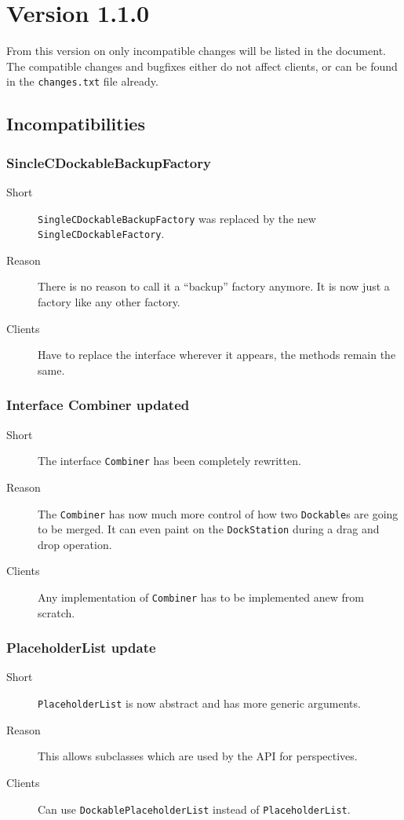 \documentclass[a4paper,10pt]{article}
\newcommand{\src}[1]{\lstinline[basicstyle=\normalsize\ttfamily,keywordstyle=\normalsize\ttfamily,identifierstyle=\normalsize\ttfamily]|#1|}
\newcommand{\short}{\item[Short]}
\newcommand{\why}{\item[Reason]}
\newcommand{\clients}{\item[Clients]}
\begin{document}
\section{Version 1.1.0}
From this version on only incompatible changes will be listed in the document. The compatible changes and bugfixes either do not affect clients, or can be found in the \src{changes.txt} file already.
\subsection{Incompatibilities}

\subsubsection{SincleCDockableBackupFactory}
\begin{description}
 \short \src{SingleCDockableBackupFactory} was replaced by the new \linebreak \src{SingleCDockableFactory}.
 \why There is no reason to call it a ``backup'' factory anymore. It is now just a factory like any other factory.
 \clients Have to replace the interface wherever it appears, the methods remain the same.
\end{description}

\subsubsection{Interface Combiner updated}
\begin{description}
 \short The interface \src{Combiner} has been completely rewritten.
 \why The \src{Combiner} has now much more control of how two \src{Dockable}s are going to be merged. It can even paint on the \src{DockStation} during a drag and drop operation.
 \clients Any implementation of \src{Combiner} has to be implemented anew from scratch.
\end{description}

\subsubsection{PlaceholderList update}
\begin{description}
 \short \src{PlaceholderList} is now abstract and has more generic arguments.
 \why This allows subclasses which are used by the API for perspectives.
 \clients Can use \src{DockablePlaceholderList} instead of \src{PlaceholderList}.
\end{description}
\end{document}
